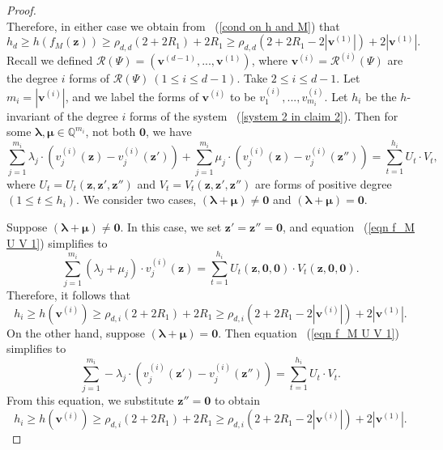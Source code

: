\documentclass[12pt]{amsart}
\theoremstyle{definition}
\theoremstyle{remark}
\numberwithin{equation}{section}
\begin{document}
\begin{proof}
$$$$
Therefore, in either case we obtain from ~(\ref{cond on h and M}) that
$$
h_d \geq h( {f}_M( \mathbf{z} ) ) \geq \rho_{d,d}( 2 + 2  R_1) + 2R_1 \geq \rho_{d,d}( 2 + 2  R_1 - 2 | { \mathbf{v} }^{(1)}|) + 2 | { \mathbf{v} }^{(1)}|.
$$
Recall we defined ${\mathcal{R}} (\Psi) = (\mathbf{v}^{(d-1)}, ..., \mathbf{v}^{(1)})$, where $\mathbf{v}^{(i)} = \mathcal{R}^{(i)}(\Psi)$ are the degree $i$ forms of
${\mathcal{R}} (\Psi) \ (1 \leq i \leq d-1)$. Take $2 \leq i \leq d-1$. Let $m_i = | \mathbf{v}^{(i)} |$, and we label the forms of $\mathbf{v}^{(i)}$ to be $v^{(i)}_1, ...,  v^{(i)}_{m_i}$. 
Let $h_i$ be the $h$-invariant of the degree $i$ forms of the system ~(\ref{system 2 in claim 2}).
Then for some $\boldsymbol{\lambda}, \boldsymbol{\mu} \in \mathbb{Q}^{m_i}$, not both $\mathbf{0}$, we have
\begin{equation}
\label{eqn f_M U V 1}
\sum_{j=1}^{m_i} \lambda_j \cdot ( v^{(i)}_j (\mathbf{z}) - v^{(i)}_j (\mathbf{z}' ) ) + \sum_{j=1}^{m_i} \mu_j \cdot ( v^{(i)}_j (\mathbf{z}) - v^{(i)}_j (\mathbf{z}'' ) )= \sum_{t=1}^{h_i} U_t \cdot V_t,
\end{equation}
where $U_t = U_t( \mathbf{z}, \mathbf{z}', \mathbf{z}'')$ and $V_t =
V_t( \mathbf{z}, \mathbf{z}', \mathbf{z}'')$ are forms of positive degree $(1 \leq t \leq h_i)$.
We consider two cases, $(\boldsymbol{\lambda} + \boldsymbol{\mu}) \not = \mathbf{0}$ and
$(\boldsymbol{\lambda} + \boldsymbol{\mu}) = \mathbf{0}$.

Suppose $(\boldsymbol{\lambda} + \boldsymbol{\mu}) \not = \mathbf{0}$. In this case, we set $\mathbf{z}' = \mathbf{z}'' = \mathbf{0}$, and equation ~(\ref{eqn f_M U V 1}) simplifies to
$$
\sum_{j=1}^{m_i} ( \lambda_j + \mu_j ) \cdot  v^{(i)}_j (\mathbf{z}) = \sum_{t=1}^{h_i} U_t( \mathbf{z}, \mathbf{0}, \mathbf{0}) \cdot  V_t ( \mathbf{z}, \mathbf{0}, \mathbf{0}).
$$
Therefore, it follows that
$$
h_i \geq h( { \mathbf{v} }^{(i)} ) \geq \rho_{d,i}( 2 + 2 R_1) + 2 R_1 \geq \rho_{d,i}( 2 + 2 R_1 - 2| { \mathbf{v} }^{(i)}|) + 2| { \mathbf{v} }^{(1)}|.
$$
On the other hand, suppose $(\boldsymbol{\lambda} + \boldsymbol{\mu}) = \mathbf{0}$.
Then equation ~(\ref{eqn f_M U V 1}) simplifies to
$$
\sum_{j=1}^{m_i} - \lambda_j \cdot (   v^{(i)}_j (\mathbf{z}') -  v^{(i)}_j (\mathbf{z}'' ) )= \sum_{t=1}^{h_i} U_t \cdot V_t.
$$
From this equation, 
we substitute $\mathbf{z}'' = \mathbf{0}$ to obtain
$$
h_i \geq h( { \mathbf{v} }^{(i)} ) \geq \rho_{d,i}( 2 + 2 R_1) + 2 R_1 \geq \rho_{d,i}( 2 + 2 R_1 - 2| { \mathbf{v} }^{(i)}|) + 2| { \mathbf{v} }^{(1)}|.
$$
\iffalse
\begin{eqnarray}
h_i &\geq&
h(  \mathbf{v}^{(i)} )
\notag
\\
&=&
h( \mathcal{R}^{(i)}(\Psi) )
\notag
\\
&\geq&
\rho_{d,i}( 2 + 2 R_1) + 2 R_1.
\notag
\\
&\geq&
\rho_{d,i}( 2 + 2 R_1 - 2 | { \mathbf{v} }^{(1)}| ) + 2 | { \mathbf{v} }^{(1)}|.
\notag
\end{eqnarray}
\fi


\end{proof}
\end{document}
